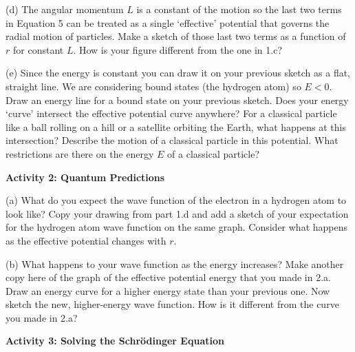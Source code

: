 (d) The angular momentum $L$ is a constant of the motion so the last two terms in 
Equation 5 can be treated as a single `effective' potential that governs the radial motion
of particles.
Make a sketch of those last two terms as a function of $r$ for constant $L$.
How is your figure different from the one in 1.c?
\vskip 3.0cm

\newpage

(e) Since the energy is constant you can draw it on your previous sketch as a flat, straight
line. We are considering bound states (the hydrogen atom) so $E < 0$.
Draw an energy line for a bound state on your previous sketch.
Does your energy `curve' intersect the effective potential curve anywhere?
For a classical particle like a ball rolling on a hill or a satellite orbiting the
Earth,
what happens at this intersection?
Describe the motion of a classical particle in this potential.
What restrictions are there on the energy $E$ of a classical particle?
\vskip 3.0cm

\textbf{Activity 2: Quantum Predictions}

(a) What do you expect the wave function of the electron in a hydrogen atom to look like?
Copy your drawing from part 1.d and add
a sketch of your expectation for the hydrogen atom wave function on the same graph. 
Consider what happens
as the effective potential changes with $r$.
\vskip 4.0cm

(b) What happens to your wave function as the energy increases?
Make another copy here of the graph of the effective potential energy that you made in 2.a.
Draw an energy curve for a higher energy state than your previous one.
Now sketch the new, higher-energy wave function.
How is it different from the curve you made in 2.a?
\vskip 4.0cm

\textbf{Activity 3: Solving the Schr\"odinger Equation}

